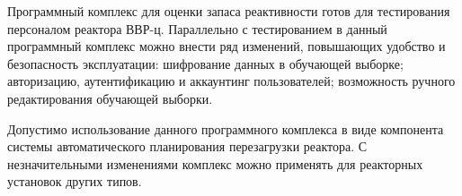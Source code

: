 Программный комплекс для оценки запаса реактивности готов для тестирования персоналом реактора ВВР-ц.
Параллельно с тестированием в данный программный комплекс можно внести ряд изменений, повышающих удобство и безопасность эксплуатации: шифрование данных в обучающей выборке; авторизацию, аутентификацию и аккаунтинг пользователей; возможность ручного редактирования обучающей выборки.

Допустимо использование данного программного комплекса в виде компонента системы автоматического планирования перезагрузки реактора. 
С незначительными изменениями комплекс можно применять для реакторных установок других типов.

